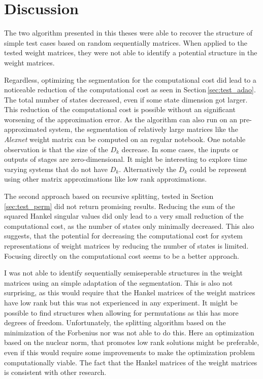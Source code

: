 \documentclass[doctype=mastersthesis,BCOR=15mm,biblatex]{ldvbook}%
\begin{document}
\chapter{Discussion}\label{chap:discussion}
The two algorithm presented in this theses were able to recover the structure of simple test cases based on random sequentially matrices.
When applied to the tested weight matrices, they were not able to identify a potential structure in the weight matrices.

Regardless, optimizing the segmentation for the computational cost did lead to a noticeable reduction of the computational cost as seen in Section\,\ref{sec:test_adao}.
The total number of states decreased, even if some state dimension got larger. 
This reduction of the computational cost is possible without an significant worsening of the approximation error. 
As the algorithm can also run on an pre-approximated system, the segmentation of relatively large matrices like the \emph{Alexnet} weight matrix can be computed on an regular notebook.
One notable observation is that the size of the $D_k$ decrease.
In some cases, the inputs or outputs of stages are zero-dimensional.
It might be interesting to explore time varying systems that do not have $D_k$.
Alternatively the $D_k$ could be represent using other matrix approximations like low rank approximations. 

The second approach based on recursive splitting, tested in Section\,\ref{sec:test_perm} did not return promising results.
Reducing the sum of the squared Hankel singular values did only lead to a very small reduction of the computational cost, as the number of states only minimally decreased.
This also suggests, that the potential for decreasing the computational cost for system representations of weight matrices by reducing the number of states is limited.
Focusing directly on the computational cost seems to be a better approach.

I was not able to identify sequentially semiseperable structures in the weight matrices using an simple adaptation of the segmentation.
This is also not surprising, as this would require that the Hankel matrices of the weight matrices have low rank but this was not experienced in any experiment.
It might be possible to find structures when allowing for permutations as this has more degrees of freedom. 
Unfortunately, the splitting algorithm based on the minimization of the Forbenius nor was not able to do this.
Here an optimization based on the nuclear norm, that promotes low rank solutions might be preferable, even if this would require some improvements to make the optimization problem computationally viable.
The fact that the Hankel matrices of the weight matrices is consistent with other research.
\end{document}
